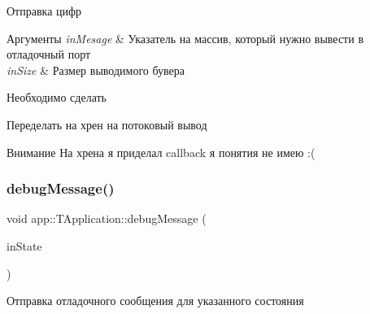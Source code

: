 Отправка цифр 



 
\begin{DoxyParams}{Аргументы}
{\em in\+Mesage} & Указатель на массив, который нужно вывести в отладочный порт \\
\hline
{\em in\+Size} & Размер выводимого бувера \\
\hline
\end{DoxyParams}
\begin{DoxyRefDesc}{Необходимо сделать}
\item[\hyperlink{todo__todo000002}{Необходимо сделать}]Переделать на хрен на потоковый вывод \end{DoxyRefDesc}
\begin{DoxyAttention}{Внимание}
На хрена я приделал callback я понятия не имею \+:( 
\end{DoxyAttention}
\mbox{\label{classapp_1_1_t_application_ade46529292a73f5184abb54b135c4a2e}} 
\subsubsection{\texorpdfstring{debug\+Message()}{debugMessage()}\hspace{0.1cm}{\footnotesize\ttfamily [4/4]}}
{\footnotesize\ttfamily void app\+::\+T\+Application\+::debug\+Message (\begin{DoxyParamCaption}\item[{const \hyperlink{group___xD0_x9F_xD0_xB5_xD1_x80_xD0_xB5_xD1_x87_xD0_xB8_xD1_x81_xD0_xBB_xD0_xB5_xD0_xBD_xD0_xB8_xD1_x8F_ga290e8080c661e52c2f685fd4af148acf}{app\+State}}]{in\+State }\end{DoxyParamCaption})}



Отправка отладочного сообщения для указанного состояния 


